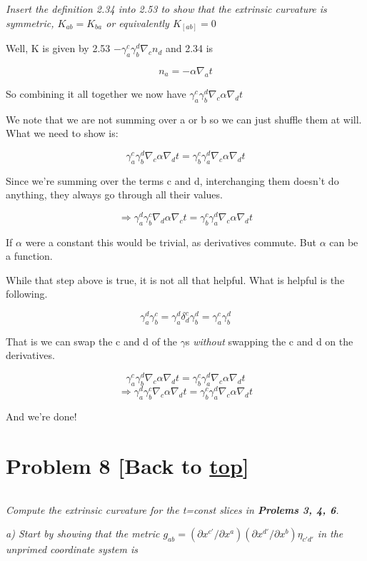 \documentclass[landscape,letterpaper,10pt,english]{article}
\begin{document}
\emph{Insert the definition 2.34 into 2.53 to show that the extrinsic
curvature is symmetric, \(K_{ab} = K_{ba}\) or equivalently
\(K_{[ab]}=0\)}

Well, K is given by 2.53 \(-\gamma^c_a \gamma^d_b \nabla_c n_d\) and
2.34 is

\[ n_a = -\alpha \nabla_a t \]

    So combining it all together we now have
\(\gamma^c_a\gamma^d_b\nabla_c \alpha \nabla_d t\)

    We note that we are not summing over a or b so we can just shuffle them
at will. What we need to show is:

\[\gamma^c_a\gamma^d_b\nabla_c \alpha \nabla_d t = \gamma^c_b\gamma^d_a\nabla_c \alpha \nabla_d t \]

Since we're summing over the terms c and d, interchanging them doesn't
do anything, they always go through all their values.

\[\Rightarrow \gamma^d_a\gamma^c_b\nabla_d \alpha \nabla_c t = \gamma^c_b\gamma^d_a\nabla_c \alpha \nabla_d t \]

If \(\alpha\) were a constant this would be trivial, as derivatives
commute. But \(\alpha\) can be a function.

While that step above is true, it is not all that helpful. What is
helpful is the following.

\[ \gamma^d_a\gamma^c_b = \gamma^d_a\delta^c_d\gamma^d_b = \gamma^c_a\gamma^d_b\]

That is we can swap the c and d of the \(\gamma\)s \emph{without}
swapping the c and d on the derivatives.

\[\gamma^c_a\gamma^d_b\nabla_c \alpha \nabla_d t = \gamma^c_b\gamma^d_a\nabla_c \alpha \nabla_d t \]
\[\Rightarrow \gamma^d_a\gamma^c_b\nabla_c \alpha \nabla_d t = \gamma^c_b\gamma^d_a\nabla_c \alpha \nabla_d t \]

And we're done!

    \hypertarget{problem-8-back-to-top}{%
\section{\texorpdfstring{Problem 8 {[}Back to
\hyperref[toc]{top}{]}}{Problem 8 {[}Back to {]}}}\label{problem-8-back-to-top}}

\[\label{P8}\]

\emph{Compute the extrinsic curvature for the t=const slices in
\textbf{Prolems 3, 4, 6}.}

\emph{a) Start by showing that the metric
\(g_{ab} = (\partial x^{c'}/\partial x^{a})(\partial x^{d'}/\partial x^b)\eta_{c'd'}\)
in the unprimed coordinate system is}
\end{document}
